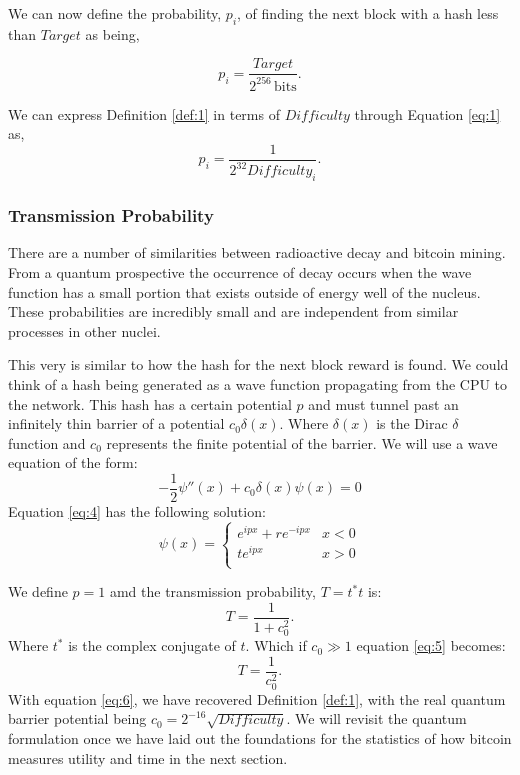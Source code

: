 \documentclass[runningheads]{llncs}
\begin{document}
We can now define the probability, $p_i$, of finding the next block with a hash less than $Target$ as being,
\begin{definition} \label{def:1}
    \begin{equation}
        p_i = \frac{Target}{2^{256}\,\mathrm{bits}}.
    \end{equation}
\end{definition}

We can express Definition \ref{def:1} in terms of $Difficulty$ through Equation \ref{eq:1} as,
\begin{equation}
    p_i = \frac{1}{2^{32}Difficulty_i}. \label{eq:3}
\end{equation}

\subsubsection{Transmission Probability}
There are a number of similarities between radioactive decay and bitcoin mining.
From a quantum prospective the occurrence of decay occurs when the wave function has a small portion that exists outside of energy well of the nucleus.
These probabilities are incredibly small and are independent from similar processes in other nuclei.

This very is similar to how the hash for the next block reward is found.
We could think of a hash being generated as a wave function propagating from the CPU to the network.
This hash has a certain potential $p$ and must tunnel past an infinitely thin barrier of a potential $c_0 \delta(x)$.
Where $\delta(x)$ is the Dirac $\delta$ function and $c_0$ represents the finite potential of the barrier.
We will use a wave equation of the form:
\begin{equation}
    -\frac{1}{2}\psi''(x) + c_0 \delta(x) \psi(x) = 0 \label{eq:4}
\end{equation}
Equation \ref{eq:4} has the following solution:
\begin{equation}
    \psi(x) =\left\{
    \begin{array}{ll}
        e^{i p x} + r e^{-i p x} & x < 0 \\
        t e^{i p x}              & x > 0 \\
    \end{array}
    \right.
\end{equation}

We define $p = 1$ amd the transmission probability, $T = t^*t$ is:
\begin{equation}
    T = \frac{1}{1 + c_0^2}. \label{eq:5}
\end{equation}
Where $t^*$ is the complex conjugate of $t$.
Which if $c_0 \gg 1$ equation \ref{eq:5} becomes:
\begin{equation}
    T = \frac{1}{c_0^2}. \label{eq:6}
\end{equation}
With equation \ref{eq:6}, we have recovered Definition \ref{def:1}, with the real quantum barrier potential being $c_0 = 2^{-16}\sqrt{Difficulty}$.
We will revisit the quantum formulation once we have laid out the foundations for the statistics of how bitcoin measures utility and time in the next section.
\end{document}
